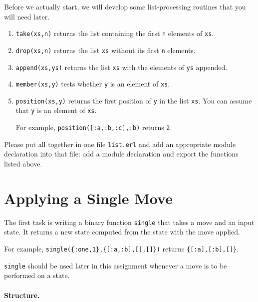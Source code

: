 \documentclass[a4paper,11pt]{article}
\begin{document}
Before we actually start, we will develop some list-processing
routines that you will need later.
\begin{enumerate}

\item \verb+take(xs,n)+ returns the list containing the first \verb+n+
  elements of \verb+xs+.

\item \verb+drop(xs,n)+ returns the list \verb+xs+ without its first
  \verb+n+ elements.

\item \verb+append(xs,ys)+ returns the list \verb+xs+ with the elements
  of \verb+ys+ appended.
  
\item \verb+member(xs,y)+ tests whether \verb+y+ is an element of \verb+xs+.

\item \verb+position(xs,y)+ returns the first position of \verb+y+ in
  the list \verb+xs+. You can assume that \verb+y+ is an element of
  \verb+xs+.

  For example, \verb+position([:a,:b,:c],:b)+ returns \verb+2+.
\end{enumerate}

Please put all together in one file \verb+list.erl+ and add an
appropriate module declaration into that file: add a module
declaration and export the functions listed above.

\section{Applying a Single Move}

The first task is writing a binary function \verb+single+ that
takes a move and an input state. It returns a
new state computed from the state with the move applied.

For example, \verb+single({:one,1},{[:a,:b],[],[]})+ returns
\verb+{[:a],[:b],[]}+.

\verb+single+ should be used later in this assignment whenever a
move is to be performed on a state.

\paragraph{Structure.}
\end{document}

